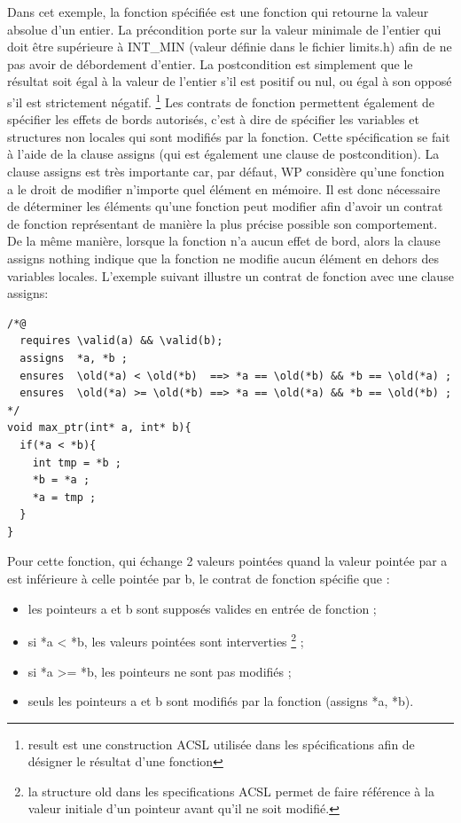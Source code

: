 Dans cet exemple, la fonction spécifiée est une fonction qui retourne la valeur absolue d'un entier. La précondition porte sur la valeur minimale de l'entier qui doit être supérieure à INT\_MIN (valeur définie dans le fichier limits.h) afin de ne pas avoir de débordement d'entier. La postcondition est simplement que le résultat soit égal à la valeur de l'entier s'il est positif ou nul, ou égal à son opposé s'il est strictement négatif. \footnote{ \SLASH result est une construction ACSL utilisée dans les spécifications afin de désigner le résultat d'une fonction}
\newline
\newline
\noindent
Les contrats de fonction permettent également de spécifier les effets de bords autorisés, c'est à dire de spécifier les variables et structures non locales qui sont modifiés par la fonction. Cette spécification se fait à l'aide de la clause assigns (qui est également une clause de postcondition). La clause assigns est très importante car, par défaut, WP considère qu’une fonction a le droit de modifier n’importe quel élément en mémoire. Il est donc nécessaire de déterminer les éléments qu'une fonction peut modifier afin d'avoir un contrat de fonction représentant de manière la plus précise possible son comportement. De la même manière, lorsque la fonction n'a aucun effet de bord, alors la clause assigns \SLASH nothing indique que la fonction ne modifie aucun élément en dehors des variables locales.
\newline
\noindent
L'exemple suivant illustre un contrat de fonction avec une clause assigns:

\begin{lstlisting}
/*@
  requires \valid(a) && \valid(b);
  assigns  *a, *b ;
  ensures  \old(*a) < \old(*b)  ==> *a == \old(*b) && *b == \old(*a) ;
  ensures  \old(*a) >= \old(*b) ==> *a == \old(*a) && *b == \old(*b) ;
*/
void max_ptr(int* a, int* b){
  if(*a < *b){
    int tmp = *b ;
    *b = *a ;
    *a = tmp ;
  }
}
\end{lstlisting}

\noindent Pour cette fonction, qui échange 2 valeurs pointées quand la valeur pointée par a est inférieure à celle pointée par b, le contrat de fonction spécifie que :
\begin{itemize}
	\item les pointeurs a et b sont supposés valides en entrée de fonction ;
	\item si *a < *b, les valeurs pointées sont interverties \footnote{la structure \SLASH old dans les specifications ACSL permet de faire référence à la valeur initiale d'un pointeur avant qu'il ne soit modifié. } ;
	\item si *a >= *b, les pointeurs ne sont pas modifiés ;
	\item seuls les pointeurs a et b sont modifiés par la fonction (assigns *a, *b).
\end{itemize}

